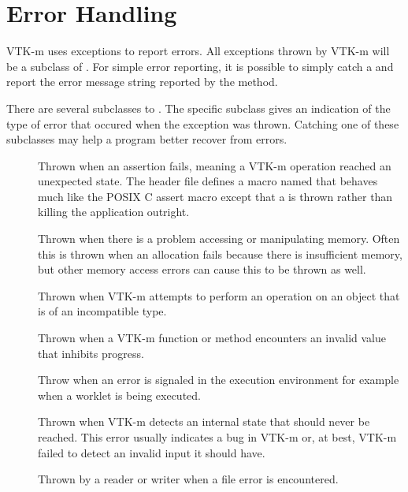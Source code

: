 


\section{Error Handling}
\label{sec:ErrorHandlingControl}


VTK-m uses exceptions to report errors. All exceptions thrown by VTK-m will
be a subclass of . For simple error reporting, it is
possible to simply catch a  and report the error message
string reported by the  method.


There are several subclasses to . The specific subclass
gives an indication of the type of error that occured when the exception
was thrown. Catching one of these subclasses may help a program better
recover from errors.
\begin{description}
\item[]  
  Thrown when an assertion fails, meaning a VTK-m operation reached an
  unexpected state. The header file 
  defines a macro named  that behaves much
  like the POSIX C assert macro except that a
   is thrown rather than killing the
  application outright.
\item[] Thrown when there is a problem
  accessing or manipulating memory. Often this is thrown when an allocation
  fails because there is insufficient memory, but other memory access
  errors can cause this to be thrown as well.
\item[] Thrown when VTK-m attempts to perform
  an operation on an object that is of an incompatible type.
\item[] Thrown when a VTK-m function or
  method encounters an invalid value that inhibits progress.
\item[]  Throw
  when an error is signaled in the execution environment for example when a
  worklet is being executed.
\item[] Thrown when VTK-m detects an
  internal state that should never be reached. This error usually indicates
  a bug in VTK-m or, at best, VTK-m failed to detect an invalid input it
  should have.
\item[] Thrown by a reader or writer when a file error is
  encountered.
\end{description}



